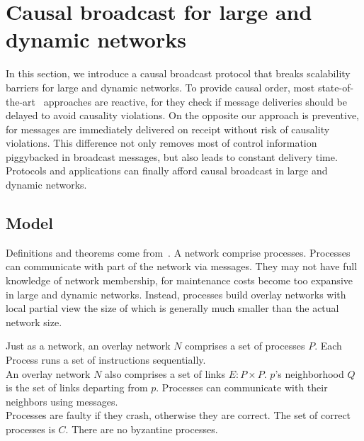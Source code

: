
\section{Causal broadcast for large and dynamic networks}
\label{sec:proposal}

In this section, we introduce a causal broadcast protocol that breaks
scalability barriers for large and dynamic networks. 
To provide causal order, most
state-of-the-art~\cite{almeida2008interval,birman1987reliable,fidge1988timestamps,hadzilacos1993fault,mattern1989virtual,mostefaoui2017probabilistic,singhal1992efficient}
approaches are reactive, for they check if message deliveries should be delayed
to avoid causality violations. On the opposite our approach is preventive, for
messages are immediately delivered on receipt without risk of causality
violations. This difference not only removes most of control information
piggybacked in broadcast messages, but also leads to constant delivery
time. Protocols and applications can finally afford causal broadcast in large
and dynamic networks. 


\subsection{Model}

Definitions and theorems come from~\cite{hadzilacos1994modular}. A network
comprise processes. Processes can communicate with part of the network via
messages. They may not have full knowledge of network membership, for
maintenance costs become too expansive in large and dynamic networks. Instead,
processes build overlay networks with local partial view the size of which is
generally much smaller than the actual network size.

\begin{definition}
  Just as a network, an overlay network $N$ comprises a set of processes
  $P$. Each Process runs a
  set of instructions sequentially. \\
  An overlay network $N$ also comprises a set of links $E: P \times P$. $p$'s
  neighborhood $Q$ is the set of links departing from $p$. Processes can
  communicate with their neighbors using messages. \\
  Processes are faulty if they crash, otherwise they are correct. The set of
  correct processes is $C$. There are no byzantine processes.
\end{definition}

